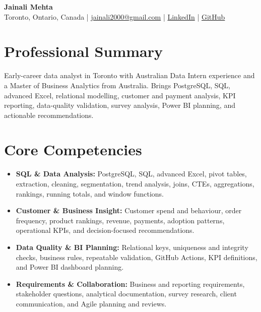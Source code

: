\documentclass[letterpaper,10pt]{article}
\begin{document}
\begin{center}
  {\fontsize{17}{19}\selectfont\textbf{Jainali Mehta}}\\[2pt]
  \small Toronto, Ontario, Canada \;|\;
  \href{mailto:jainali2000@gmail.com}{jainali2000@gmail.com} \;|\;
  \href{https://www.linkedin.com/in/jainali-mehta}{LinkedIn} \;|\;
  \href{https://github.com/jainalimehta}{GitHub}
\end{center}
\vspace{-7pt}

\section{Professional Summary}
\small Early-career data analyst in Toronto with Australian Data Intern experience and a Master of Business Analytics from Australia. Brings PostgreSQL, SQL, advanced Excel, relational modelling, customer and payment analysis, KPI reporting, data-quality validation, survey analysis, Power BI planning, and actionable recommendations.

\section{Core Competencies}
\begin{itemize}[leftmargin=0.16in,label=\textbullet,topsep=0pt,itemsep=1pt,parsep=0pt]
  \item \small \textbf{SQL \& Data Analysis:} PostgreSQL, SQL, advanced Excel, pivot tables, extraction, cleaning, segmentation, trend analysis, joins, CTEs, aggregations, rankings, running totals, and window functions.
  \item \small \textbf{Customer \& Business Insight:} Customer spend and behaviour, order frequency, product rankings, revenue, payments, adoption patterns, operational KPIs, and decision-focused recommendations.
  \item \small \textbf{Data Quality \& BI Planning:} Relational keys, uniqueness and integrity checks, business rules, repeatable validation, GitHub Actions, KPI definitions, and Power BI dashboard planning.
  \item \small \textbf{Requirements \& Collaboration:} Business and reporting requirements, stakeholder questions, analytical documentation, survey research, client communication, and Agile planning and reviews.
\end{itemize}
\end{document}
